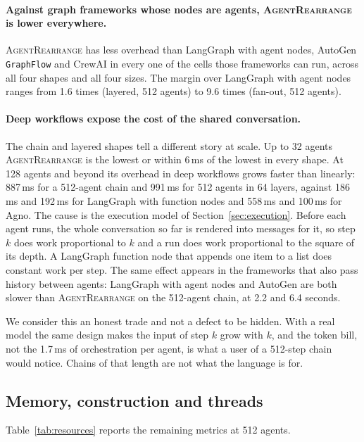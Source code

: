 \documentclass[11pt]{article}
\newcommand{\code}[1]{\texttt{#1}}
\newcommand{\AR}{\textsc{AgentRearrange}}
\begin{document}
\paragraph{Against graph frameworks whose nodes are agents, \AR{} is lower everywhere.}
\AR{} has less overhead than LangGraph with agent nodes, AutoGen \code{GraphFlow} and CrewAI in every one of the cells those frameworks can run, across all four shapes and all four sizes. The margin over LangGraph with agent nodes ranges from 1.6 times (layered, 512 agents) to 9.6 times (fan-out, 512 agents).

\paragraph{Deep workflows expose the cost of the shared conversation.}
The chain and layered shapes tell a different story at scale. Up to 32 agents \AR{} is the lowest or within 6\,ms of the lowest in every shape. At 128 agents and beyond its overhead in deep workflows grows faster than linearly: 887\,ms for a 512-agent chain and 991\,ms for 512 agents in 64 layers, against 186\,ms and 192\,ms for LangGraph with function nodes and 558\,ms and 100\,ms for Agno. The cause is the execution model of Section~\ref{sec:execution}. Before each agent runs, the whole conversation so far is rendered into messages for it, so step $k$ does work proportional to $k$ and a run does work proportional to the square of its depth. A LangGraph function node that appends one item to a list does constant work per step. The same effect appears in the frameworks that also pass history between agents: LangGraph with agent nodes and AutoGen are both slower than \AR{} on the 512-agent chain, at 2.2 and 6.4 seconds.

We consider this an honest trade and not a defect to be hidden. With a real model the same design makes the input of step $k$ grow with $k$, and the token bill, not the 1.7\,ms of orchestration per agent, is what a user of a 512-step chain would notice. Chains of that length are not what the language is for.

\subsection{Memory, construction and threads}

Table~\ref{tab:resources} reports the remaining metrics at 512 agents.
\end{document}
